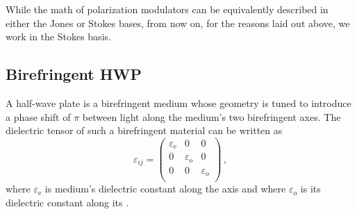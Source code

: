 While the math of polarization modulators can be equivalently described in either the Jones or Stokes bases, from now on, for the reasons laid out above, we work in the Stokes basis.


\subsection{Birefringent HWP}
\label{sec:birefringent_hwp}

A half-wave plate is a birefringent medium whose geometry is tuned to introduce a phase shift of $\pi$ between light along the medium's two birefringent axes. The dielectric tensor of such a birefringent material can be written as
\begin{equation}
    \varepsilon_{i j} = 
    \begin{pmatrix}
    \varepsilon_{\mathrm{e}} & 0 & 0 \\
    0 & \varepsilon_{\mathrm{o}} & 0 \\
    0 & 0 & \varepsilon_{\mathrm{o}} \\
    \end{pmatrix} \, ,
\end{equation}
where $\varepsilon_{\mathrm{e}}$ is medium's dielectric constant along the  axis and where $\varepsilon_{\mathrm{o}}$ is its dielectric constant along its . 

